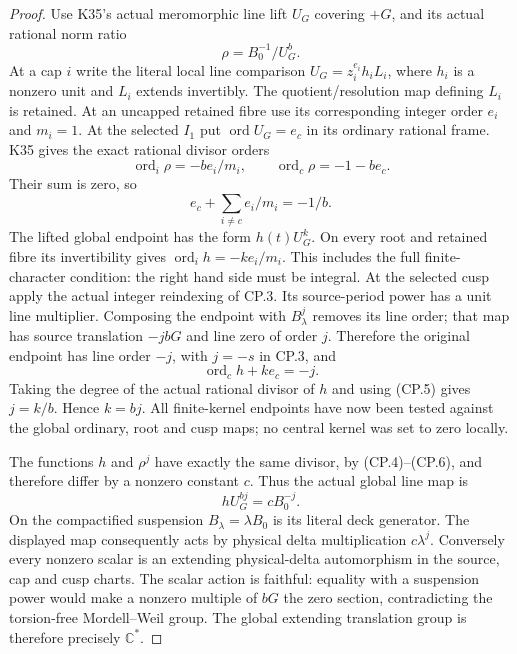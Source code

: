 \begin{proof}
Use K35's actual meromorphic line lift \(U_G\) covering \(+G\),
and its actual rational norm ratio
\[
                   \rho=B_0^{-1}/U_G^b.                   \tag{CP.4}
\]
At a cap \(i\) write the literal local line comparison
\(U_G=z_i^{e_i}h_iL_i\), where \(h_i\) is a nonzero unit and
\(L_i\) extends invertibly. The quotient/resolution map defining
\(L_i\) is retained. At an uncapped retained fibre use its
corresponding integer order \(e_i\) and \(m_i=1\). At the
selected \(I_1\) put \(\operatorname{ord}U_G=e_c\) in its
ordinary rational frame. K35 gives the exact rational divisor orders
\[
 \operatorname{ord}_i\rho=-be_i/m_i,
 \qquad\operatorname{ord}_c\rho=-1-be_c.
\]
Their sum is zero, so
\[
                   e_c+\sum_{i\ne c}e_i/m_i=-1/b.          \tag{CP.5}
\]
The lifted global endpoint has the form \(h(t)U_G^k\). On every
root and retained fibre its invertibility gives
\(\operatorname{ord}_i h=-ke_i/m_i\). This includes the full
finite-character condition: the right hand side must be integral.
At the selected cusp apply the actual integer reindexing of CP.3.
Its source-period power has a unit line multiplier. Composing the
endpoint with \(B_\lambda^j\) removes its line order; that map
has source translation \(-jbG\) and line zero of order \(j\).
Therefore the original endpoint has line order \(-j\), with
\(j=-s\) in CP.3, and
\[
                      \operatorname{ord}_c h+ke_c=-j.
                                                               \tag{CP.6}
\]
Taking the degree of the actual rational divisor of \(h\) and
using (CP.5) gives \(j=k/b\). Hence \(k=bj\). All finite-kernel
endpoints have now been tested against the global ordinary, root
and cusp maps; no central kernel was set to zero locally.

The functions \(h\) and \(\rho^j\) have exactly the same divisor,
by (CP.4)--(CP.6), and therefore differ by a nonzero constant \(c\).
Thus the actual global line map is
\[
                hU_G^{bj}=cB_0^{-j}.
\]
On the compactified suspension \(B_\lambda=\lambda B_0\) is its
literal deck generator. The displayed map consequently acts by
physical delta multiplication \(c\lambda^j\). Conversely every
nonzero scalar is an extending physical-delta automorphism in the
source, cap and cusp charts. The scalar action is faithful: equality
with a suspension power would make a nonzero multiple of \(bG\)
the zero section, contradicting the torsion-free Mordell--Weil group.
The global extending translation group is therefore precisely
\(\mathbb C^*\).

\par


\end{proof}
